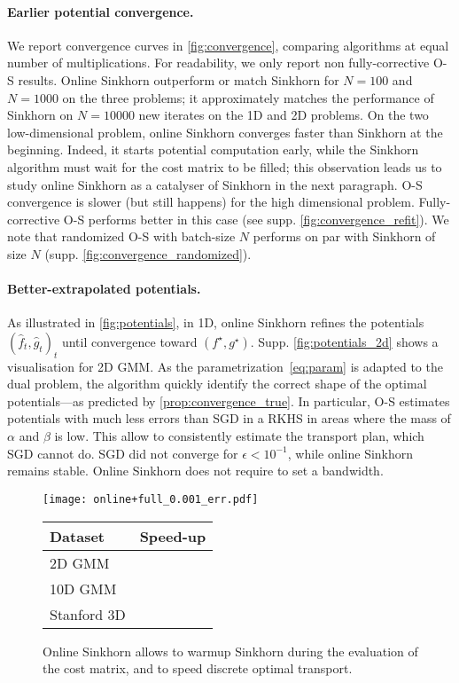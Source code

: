 \paragraph{Earlier potential convergence.} 
We report convergence curves in \autoref{fig:convergence}, comparing algorithms
at equal number of multiplications. For readability, we only report non
fully-corrective O-S results. Online Sinkhorn outperform or match Sinkhorn for $N=100$
and $N=1000$ on the three problems; it approximately matches the performance of
Sinkhorn on $N=10000$ new iterates on the 1D and 2D problems. On the two
low-dimensional problem, online Sinkhorn converges faster than Sinkhorn at the
beginning. Indeed, it starts potential computation early, while the Sinkhorn
algorithm must wait for the cost matrix to be filled;  this observation leads us
to study online Sinkhorn as a catalyser of Sinkhorn in the next paragraph. O-S
convergence is slower (but still happens) for the high dimensional problem.
Fully-corrective O-S performs better in this case (see supp. \autoref{fig:convergence_refit}). We note that
randomized O-S with batch-size $N$ performs on par with Sinkhorn of size $N$ (supp. \autoref{fig:convergence_randomized}).

\paragraph{Better-extrapolated potentials.} As illustrated in
\autoref{fig:potentials}, in 1D, online Sinkhorn refines the potentials $(\hat f_t, \hat g_t)_t$
until convergence toward $(f^\star, g^\star)$. Supp. \autoref{fig:potentials_2d} shows a visualisation for 2D GMM. As the parametrization~\eqref{eq:param} is 
adapted to the dual problem, the algorithm quickly identify the correct shape of
the optimal potentials---as predicted by \autoref{prop:convergence_true}. In
particular, O-S estimates potentials with much less errors than SGD in a RKHS in
areas where the mass of $\alpha$ and $\beta$ is low. This allow to consistently estimate the transport plan, which SGD cannot do. SGD did not converge
for $\epsilon < 10^{-1}$, while online Sinkhorn remains stable. Online
Sinkhorn does not require to set a bandwidth.


\begin{figure}[t]
    \begin{minipage}{.7\textwidth}
    \texttt{[image: online+full\_0.001\_err.pdf]}
    \caption{Online Sinkhorn allows to warmup Sinkhorn during the evaluation of the cost matrix, and to speed discrete optimal transport.}
    \label{fig:warmup}
    \end{minipage}%
    \hfill
    \begin{minipage}{.25\textwidth}
        \small
        \begin{tabular}{lc}
            Dataset & Speed-up\\
            \toprule
            2D GMM & \\
            10D GMM & \\
            Stanford 3D & \\
            \bottomrule
        \end{tabular}
    \end{minipage}
\end{figure}



